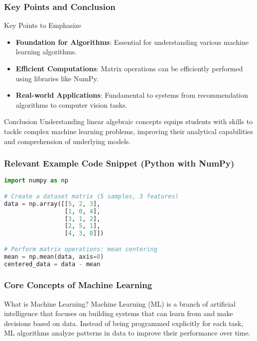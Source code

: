 \documentclass{beamer}
\begin{document}
\begin{frame}[fragile]
    \frametitle{Key Points and Conclusion}
    \begin{block}{Key Points to Emphasize}
        \begin{itemize}
            \item \textbf{Foundation for Algorithms}: Essential for understanding various machine learning algorithms.
            \item \textbf{Efficient Computations}: Matrix operations can be efficiently performed using libraries like NumPy.
            \item \textbf{Real-world Applications}: Fundamental to systems from recommendation algorithms to computer vision tasks.
        \end{itemize}
    \end{block}

    \begin{block}{Conclusion}
        Understanding linear algebraic concepts equips students with skills to tackle complex machine learning problems, improving their analytical capabilities and comprehension of underlying models.
    \end{block}
\end{frame}

\begin{frame}[fragile]
    \frametitle{Relevant Example Code Snippet (Python with NumPy)}
    \begin{lstlisting}[language=Python]
import numpy as np

# Create a dataset matrix (5 samples, 3 features)
data = np.array([[5, 2, 3],
                 [1, 0, 4],
                 [3, 1, 2],
                 [2, 5, 1],
                 [4, 3, 0]])

# Perform matrix operations: mean centering
mean = np.mean(data, axis=0)
centered_data = data - mean
    \end{lstlisting}
\end{frame}

\begin{frame}[fragile]
    \frametitle{Core Concepts of Machine Learning}
    \begin{block}{What is Machine Learning?}
        Machine Learning (ML) is a branch of artificial intelligence that focuses on building systems that can learn from and make decisions based on data. Instead of being programmed explicitly for each task, ML algorithms analyze patterns in data to improve their performance over time.
    \end{block}
\end{frame}
\end{document}
